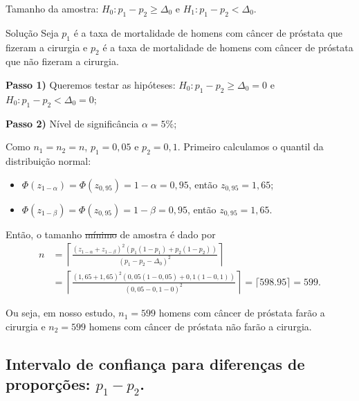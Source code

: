 \documentclass[9pt]{beamer}
\begin{document}
\begin{frame}{Tamanho da amostra: $H_0:p_1 - p_2 \geq \Delta_0$ e $H_1: p_1 - p_2 < \Delta_0$.}

\normalsize
\begin{block}{Solução}
	Seja $p_1$ é a taxa de mortalidade de homens com câncer de próstata que fizeram a cirurgia e $p_2$ é a taxa de mortalidade de homens com câncer de próstata que não fizeram a cirurgia.
	
	\textbf{Passo 1)} Queremos testar as hipóteses: $H_0: p_1 - p_2 \geq \Delta_0=0$ e $H_0: p_1 - p_2 < \Delta_0=0$;
	
	\textbf{Passo 2)} Nível de significância $\alpha=5\%$;
	
	Como $n_1=n_2=n$, $p_1=0,05$ e $p_2=0,1$. Primeiro calculamos o quantil da distribuição normal:
	\begin{itemize}
		\item $\Phi\left(z_{1-\alpha}\right) = \Phi\left(z_{0,95}\right) =1- \alpha = 0,95$, então $z_{0,95} = 1,65$;
		\item $\Phi\left(z_{1-\beta}\right) = \Phi\left(z_{0,95}\right) = 1-\beta=0,95$, então $z_{0,95} = 1,65$.
	\end{itemize}
	Então, o tamanho \sout{mínimo} de amostra é dado por
	\begin{align*}
		n &= \left\lceil \frac{\left( z_{1-\alpha} + z_{1-\beta} \right)^2 \left( p_1(1 - p_1) + p_2(1 - p_2) \right)}{\left(p_1 - p_2 - \Delta_0\right)^2} \right\rceil\\
		&= \left\lceil \frac{\left( 1,65 + 1,65 \right)^2 \left( 0,05(1 - 0,05) + 0,1(1 - 0,1) \right)}{\left(0,05 - 0,1 - 0\right)^2} \right\rceil = \lceil 598.95 \rceil = 599.
	\end{align*}
\end{block}

Ou seja, em nosso estudo, $n_1=599$ homens com câncer de próstata farão a cirurgia e $n_2=599$ homens com câncer de próstata não farão a cirurgia. 

\normalsize
\end{frame}

\subsection{Intervalo de confiança para diferenças de proporções: $p_1-p_2$.}
\end{document}
